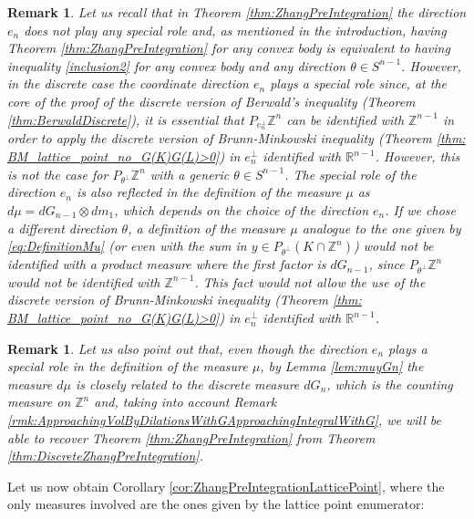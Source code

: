\documentclass[10pt]{amsart}
\newtheorem{rmk}[thm]{Remark}
\def\R{\mathbb{R}}
\def\Z{\mathbb{Z}}
\numberwithin{equation}{section}
\begin{document}
\begin{rmk}
Let us recall that in Theorem \ref{thm:ZhangPreIntegration} the direction $e_n$ does not play any special role and, as mentioned in the introduction, having Theorem \ref{thm:ZhangPreIntegration} for any convex body is equivalent to having inequality \eqref{inclusion2} for any convex body and any direction $\theta\in S^{n-1}$. However, in the discrete case the coordinate direction $e_n$ plays a special role since, at the core of the proof of the discrete version of Berwald's inequality (Theorem \ref{thm:BerwaldDiscrete}), it is essential that $P_{e_n^\perp}\Z^n$ can be identified with $\Z^{n-1}$ in order to apply the discrete version of Brunn-Minkowski inequality (Theorem \ref{thm: BM_lattice_point_no_G(K)G(L)>0}) in $e_n^\perp$ identified with $\R^{n-1}$. However, this is not the case for $P_{\theta^\perp}\Z^n$ with a generic $\theta\in S^{n-1}$. The special role of the direction $e_n$ is also reflected in the definition of the measure $\mu$ as $d\mu=dG_{n-1}\otimes dm_1$, which depends on the choice of the direction $e_n$. If we chose a different direction $\theta$, a definition of the measure $\mu$ analogue to the one given by \eqref{eq:DefinitionMu} (or even with the sum in $y\in P_{\theta^\perp}(K\cap\Z^n)$) would not be identified with a product measure where the first factor is $dG_{n-1}$, since $P_{\theta^\perp}\Z^n$ would not be identified with $\Z^{n-1}$. This fact would not allow the use of the discrete version of Brunn-Minkowski inequality (Theorem \ref{thm: BM_lattice_point_no_G(K)G(L)>0}) in $e_n^\perp$ identified with $\R^{n-1}$.
\end{rmk}

\begin{rmk}
Let us also point out that, even though the direction $e_n$ plays a special role in the definition of the measure $\mu$, by Lemma \ref{lem:muyGn} the measure $d\mu$ is closely related to the discrete measure $dG_n$, which is the counting measure on $\Z^n$ and, taking into account Remark \ref{rmk:ApproachingVolByDilationsWithGApproachingIntegralWithG}, we will be able to recover Theorem \ref{thm:ZhangPreIntegration} from Theorem \ref{thm:DiscreteZhangPreIntegration}.
\end{rmk}
Let us now obtain Corollary \ref{cor:ZhangPreIntegrationLatticePoint}, where the only measures involved are the ones given by the lattice point enumerator:
\end{document}
